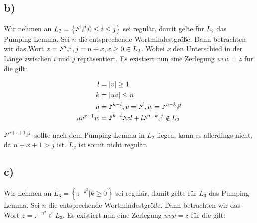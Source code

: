 \documentclass{article}
\begin{document}
\subsection*{b)}
Wir nehmen an $L_2=\left\{\eighthnote^i\halfnote^j | 0\leq i \leq j\right\}$ sei regulär, damit gelte für $L_2$ das Pumping Lemma. Sei $n$ die entsprechende Wortmindestgröße. Dann betrachten wir das Wort $z=\eighthnote^n\halfnote^j, j = n + x, x \geq 0 \in L_2$. Wobei $x$ den Unterschied in der Länge zwischen $i$ und $j$ repräsentiert. Es existiert nun eine Zerlegung $uvw=z$ für die gilt:

\begin{align}
l &= |v| \geq 1\\
k &= |uv| \leq n\\
u &= \eighthnote^{k-l}, v = \eighthnote^l, w = \eighthnote^{n-k}\halfnote^j \\
uv^{x+1}w &= \eighthnote^{k-l}\eighthnote{xl+l}\eighthnote^{n-k}\halfnote^{j} \notin L_2
\end{align}

$\eighthnote^{n+x+1}\halfnote^{j}$ sollte nach dem Pumping Lemma in $L_2$ liegen, kann es allerdings nicht, da $n+x+1 > j $ ist. $L_2$ ist somit nicht regulär.
\setcounter{equation}{0}

%
%
%

\subsection*{c)}
Wir nehmen an $L_3=\left\{\quarternote^{k^2}| k\geq0 \right\}$ sei regulär, damit gelte für $L_3$ das Pumping Lemma. Sei $n$ die entsprechende Wortmindestgröße. Dann betrachten wir das Wort $z=\quarternote^{n^2} \in L_3$. Es existiert nun eine Zerlegung $uvw=z$ für die gilt:
\end{document}

